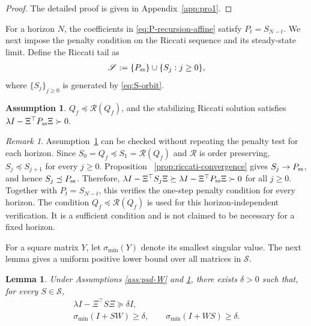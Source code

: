 \documentclass[10pt,journal,twoside]{IEEEtran}
\newtheorem{lemma}{Lemma}
\theoremstyle{definition}
\newtheorem{assumption}{Assumption}
\theoremstyle{remark}
\newtheorem{remark}{Remark}
\begin{document}
\begin{proof}
	The detailed proof is given in
	Appendix~\ref{app:pro1}.
\end{proof}




 For a horizon \(N\), the coefficients in
\eqref{eq:P-recursion-affine} satisfy \(P_t=S_{N-t}\).
We next impose the penalty condition on the Riccati sequence and its steady-state limit. Define the Riccati tail as
\begin{align}\label{eq:closed-riccati-tail-set}
    \mathscr S:=\{P_{\rm ss}\}\cup\{S_j:j\ge0\},
\end{align}
where \(\{S_j\}_{j\ge0}\) is generated by \eqref{eq:S-orbit}.




\begin{assumption}
	\label{ass:riccati-penalty}
	$Q_f\preceq\mathcal R(Q_f)$, and the stabilizing Riccati solution satisfies
	\(
		\lambda I-\Xi^\top P_{\rm ss}\Xi\succ0 .
	\)
\end{assumption}










\begingroup
\begin{remark}
		Assumption~\ref{ass:riccati-penalty} can be checked without repeating the
penalty test for each horizon. Since
\(S_0=Q_f\preceq S_1=\mathcal R(Q_f)\) and \(\mathcal R\) is order
preserving, \(S_j\preceq S_{j+1}\) for every \(j\ge0\). Proposition~
\ref{prop:riccati-convergence} gives \(S_j\to P_{\rm ss}\), and hence
\(S_j\preceq P_{\rm ss}\). Therefore,
$\lambda I-\Xi^\top S_j\Xi
\succeq
\lambda I-\Xi^\top P_{\rm ss}\Xi
\succ0$ for all $j\ge0$.
Together with \(P_t=S_{N-t}\), this verifies the one-step penalty condition
for every horizon. The condition \(Q_f\preceq\mathcal R(Q_f)\) is used for this
horizon-independent verification. It is a sufficient condition and is not
claimed to be necessary for a fixed horizon.
\end{remark}
\endgroup




For a square matrix \(Y\), let \(\sigma_{\min}(Y)\) denote its smallest singular value. The next lemma gives a {uniform} positive lower bound over all matrices in \(\mathscr S\).

\begin{lemma}
	\label{lem:closed-tail-margin}
Under	Assumptions
   \ref{ass:psd-W} and
	\ref{ass:riccati-penalty}, there exists \(\delta>0\) such that, for
	every \(S\in\mathscr S\),
	\begin{equation}
		\begin{gathered}
			\lambda I-\Xi^\top S\Xi\succeq \delta I,\\
			\sigma_{\min}(I+SW)\ge\delta,
			\qquad
			\sigma_{\min}(I+WS)\ge\delta .
		\end{gathered}
		\label{eq:uniform-admissibility-orbit}
	\end{equation}
\end{lemma}
\end{document}

